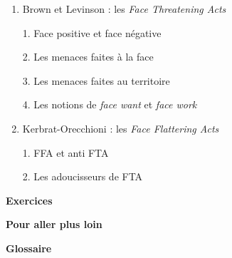 \begin{keybox}
\begin{enumerate}[label=\arabic*.]
\begin{enumerate}[label=\textcircled{\scriptsize\arabic*}]
\item Brown et Levinson : les \textit{Face Threatening Acts}\par 1. Face positive et face négative\par 2. Les menaces faites à la face\par 3. Les menaces faites au territoire\par 4. Les notions de \textit{face want} et \textit{face work}
\item Kerbrat-Orecchioni : les \textit{Face Flattering Acts}\par 1. FFA et anti FTA\par 2. Les adoucisseurs de FTA
\end{enumerate}
\end{enumerate}
\textbf{Exercices}\par\textbf{Pour aller plus loin}\par\textbf{Glossaire}
\end{keybox}

